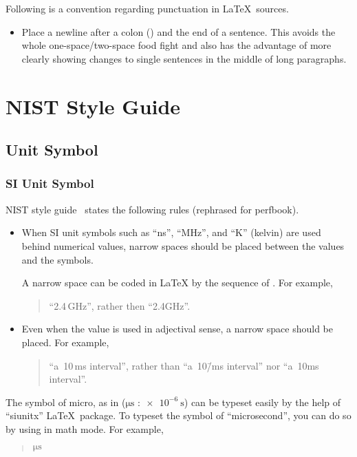 Following is a convention regarding punctuation in \LaTeX\ sources.

\begin{itemize}
\item Place a newline after a colon (\co{:}) and the end of a sentence.
  This avoids the whole one-space/two-space food fight and also has
  the advantage of more clearly showing changes to single sentences
  in the middle of long paragraphs.
\end{itemize}

\section{NIST Style Guide}
\label{sec:app:styleguide:NIST Style Guide}

\subsection{Unit Symbol}
\label{sec:app:styleguide:Unit Symbol}

\subsubsection{SI Unit Symbol}
\label{sec:app:styleguide:SI Unit Symbol}

NIST style guide~\cite[Chapter 5]{NIST:SP:330:2019}
states the following rules (rephrased for perfbook).

\begin{itemize}
\item When SI unit symbols such as ``ns'', ``MHz'', and ``K'' (kelvin)
are used behind numerical values, narrow spaces should be placed between
the values and the symbols.

A narrow space can be coded in \LaTeX{} by the sequence of \qco{\\,}.
For example,
\begin{quote}
  ``2.4\,GHz'', rather then ``2.4GHz''.
\end{quote}

\item Even when the value is used in adjectival sense, a narrow space
  should be placed.
  For example,
\begin{quote}
  ``a~10\,ms interval'', rather than ``a~10\=/ms interval'' nor
  ``a~10ms interval''.
\end{quote}
\end{itemize}

The symbol of micro, as in ($\unit{\us}$ :$\qty{e-6}{\second}$) can
be typeset easily by the help of ``siunitx'' \LaTeX\ package.
To typeset the symbol of ``microsecond'', you can do
so by using \qco{\\unit\{\\us\}} in math mode.
For example,
\begin{quote}
  $\unit{\us}$
\end{quote}

